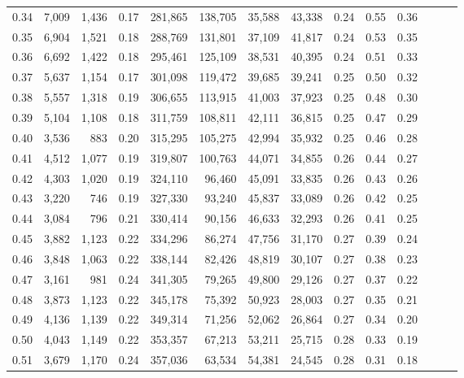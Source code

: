 \begin{tabular}{rrrrrrrrrrrrrr}
0.34 &   7,009 &  1,436 &  0.17 &  281,865 &  138,705 &  35,588 &  43,338 &  0.24 &  0.55 &      0.36 \\
0.35 &   6,904 &  1,521 &  0.18 &  288,769 &  131,801 &  37,109 &  41,817 &  0.24 &  0.53 &      0.35 \\
0.36 &   6,692 &  1,422 &  0.18 &  295,461 &  125,109 &  38,531 &  40,395 &  0.24 &  0.51 &      0.33 \\
0.37 &   5,637 &  1,154 &  0.17 &  301,098 &  119,472 &  39,685 &  39,241 &  0.25 &  0.50 &      0.32 \\
0.38 &   5,557 &  1,318 &  0.19 &  306,655 &  113,915 &  41,003 &  37,923 &  0.25 &  0.48 &      0.30 \\
0.39 &   5,104 &  1,108 &  0.18 &  311,759 &  108,811 &  42,111 &  36,815 &  0.25 &  0.47 &      0.29 \\
0.40 &   3,536 &    883 &  0.20 &  315,295 &  105,275 &  42,994 &  35,932 &  0.25 &  0.46 &      0.28 \\
0.41 &   4,512 &  1,077 &  0.19 &  319,807 &  100,763 &  44,071 &  34,855 &  0.26 &  0.44 &      0.27 \\
0.42 &   4,303 &  1,020 &  0.19 &  324,110 &   96,460 &  45,091 &  33,835 &  0.26 &  0.43 &      0.26 \\
0.43 &   3,220 &    746 &  0.19 &  327,330 &   93,240 &  45,837 &  33,089 &  0.26 &  0.42 &      0.25 \\
0.44 &   3,084 &    796 &  0.21 &  330,414 &   90,156 &  46,633 &  32,293 &  0.26 &  0.41 &      0.25 \\
0.45 &   3,882 &  1,123 &  0.22 &  334,296 &   86,274 &  47,756 &  31,170 &  0.27 &  0.39 &      0.24 \\
0.46 &   3,848 &  1,063 &  0.22 &  338,144 &   82,426 &  48,819 &  30,107 &  0.27 &  0.38 &      0.23 \\
0.47 &   3,161 &    981 &  0.24 &  341,305 &   79,265 &  49,800 &  29,126 &  0.27 &  0.37 &      0.22 \\
0.48 &   3,873 &  1,123 &  0.22 &  345,178 &   75,392 &  50,923 &  28,003 &  0.27 &  0.35 &      0.21 \\
0.49 &   4,136 &  1,139 &  0.22 &  349,314 &   71,256 &  52,062 &  26,864 &  0.27 &  0.34 &      0.20 \\
0.50 &   4,043 &  1,149 &  0.22 &  353,357 &   67,213 &  53,211 &  25,715 &  0.28 &  0.33 &      0.19 \\
0.51 &   3,679 &  1,170 &  0.24 &  357,036 &   63,534 &  54,381 &  24,545 &  0.28 &  0.31 &      0.18 \\

\end{tabular}
